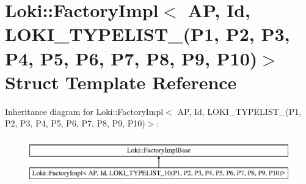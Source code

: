 \hypertarget{structLoki_1_1FactoryImpl_3_01AP_00_01Id_00_01LOKI__TYPELIST__10_07P1_00_01P2_00_01P3_00_01P4_006bf86c8d65ea04f4e008765340803443}{}\section{Loki\+:\+:Factory\+Impl$<$ A\+P, Id, L\+O\+K\+I\+\_\+\+T\+Y\+P\+E\+L\+I\+S\+T\+\_(P1, P2, P3, P4, P5, P6, P7, P8, P9, P10)$>$ Struct Template Reference}
\label{structLoki_1_1FactoryImpl_3_01AP_00_01Id_00_01LOKI__TYPELIST__10_07P1_00_01P2_00_01P3_00_01P4_006bf86c8d65ea04f4e008765340803443}
Inheritance diagram for Loki\+:\+:Factory\+Impl$<$ A\+P, Id, L\+O\+K\+I\+\_\+\+T\+Y\+P\+E\+L\+I\+S\+T\+\_(P1, P2, P3, P4, P5, P6, P7, P8, P9, P10)$>$\+:\begin{figure}[H]
\begin{center}
\leavevmode
\includegraphics[height=2.000000cm]{structLoki_1_1FactoryImpl_3_01AP_00_01Id_00_01LOKI__TYPELIST__10_07P1_00_01P2_00_01P3_00_01P4_006bf86c8d65ea04f4e008765340803443}
\end{center}
\end{figure}
